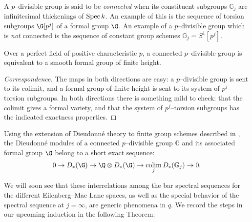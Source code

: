 \begin{definition}
A \(p\)--divisible group is said to be \textit{connected} when its constituent subgroups \(\mathbb G_j\) are infinitesimal thickenings of \(\operatorname{Spec} k\).
An example of this is the sequence of torsion subgroups \(\G[p^j]\) of a formal group \(\G\).
An example of a \(p\)--divisible group which is \emph{not} connected is the sequence of constant group schemes \(\mathbb G_j = S^1[p^j]\).
\end{definition}

\begin{lemma}
Over a perfect field of positive characteristic \(p\), a connected \(p\)--divisible group is equivalent to a smooth formal group of finite height.
\end{lemma}
\begin{proof}[Correspondence]
The maps in both directions are easy: a \(p\)--divisible group is sent to its colimit, and a formal group of finite height is sent to its system of \(p^j\)--torsion subgroups.
In both directions there is something mild to check: that the colimit gives a formal variety, and that the system of \(p^j\)--torsion subgroups has the indicated exactness properties.
\end{proof}

\begin{remark}\label{DieudonneModsForPDivVsFormal}
Using the extension of Dieudonn\'e theory to finite group schemes described in , the Dieudonn\'e modules of a connected \(p\)--divisible group \(\mathbb G\) and its associated formal group \(\G\) belong to a short exact sequence: \[0 \to D_*(\G) \to \Q \otimes D_*(\G) \to \colim_j D_*(\mathbb G_j) \to 0.\]
\end{remark}

We will soon see that these interrelations among the bar spectral sequences for the different Eilenberg--Mac Lane spaces, as well as the special behavior of the spectral sequence at \(j = \infty\), are generic phenomena in \(q\).
We record the steps in our upcoming induction in the following Theorem:

